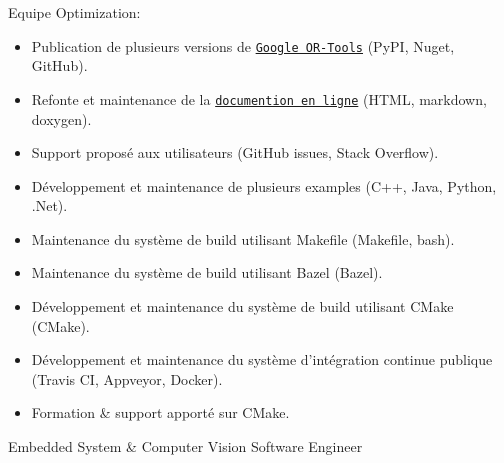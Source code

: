 \documentclass{article}
\begin{document}
\begin{llist}
{Equipe Optimization:
\vspace{-0.33cm}
\begin{itemize}
	\item Publication de plusieurs versions de
		\href{https://github.com/google/or-tools}{\texttt{Google OR-Tools}} (PyPI, Nuget, GitHub).
  \item Refonte et maintenance de la \href{https://developers.google.com/optimization/}{\texttt{documention en ligne}} (HTML, markdown, doxygen).
  \item Support propos\'{e} aux utilisateurs (GitHub issues, Stack Overflow).
  \item D\'{e}veloppement et maintenance de plusieurs examples (C++, Java, Python, .Net).
  \item Maintenance du syst\`{e}me de build utilisant Makefile (Makefile, bash).
  \item Maintenance du syst\`{e}me de build utilisant Bazel (Bazel).
  \item D\'{e}veloppement et maintenance du syst\`{e}me de build utilisant CMake (CMake).
  \item D\'{e}veloppement et maintenance du syst\`{e}me d'int\'{e}gration continue publique (Travis CI, Appveyor, Docker).
  \item Formation \& support apport\'{e} sur CMake.
\end{itemize}
}

 {
Embedded System \& Computer Vision Software Engineer \\
\vspace{-0.33cm}

}
\end{llist}
\end{document}
